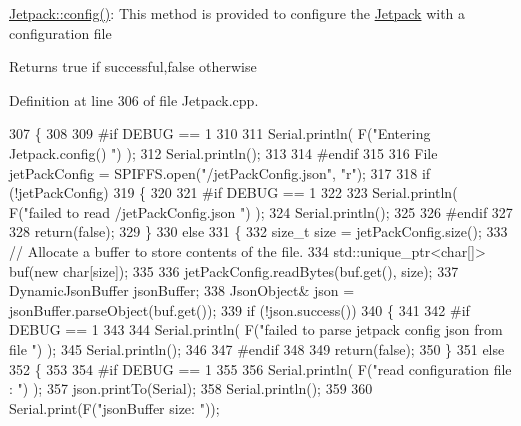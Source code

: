 \hyperlink{class_jetpack_ab065ee83e244265a2223a22f3ee4a719}{Jetpack\+::config()}\+: This method is provided to configure the \hyperlink{class_jetpack}{Jetpack} with a configuration file

\begin{DoxyReturn}{Returns}
true if successful,false otherwise 
\end{DoxyReturn}


Definition at line 306 of file Jetpack.\+cpp.


\begin{DoxyCode}
307 \{
308 
309 \textcolor{preprocessor}{#if DEBUG == 1 }
310 
311     Serial.println( F(\textcolor{stringliteral}{"Entering Jetpack.config() "}) );
312     Serial.println();
313 
314 \textcolor{preprocessor}{#endif}
315 
316     File jetPackConfig = SPIFFS.open(\textcolor{stringliteral}{"/jetPackConfig.json"}, \textcolor{stringliteral}{"r"});
317 
318     \textcolor{keywordflow}{if} (!jetPackConfig) 
319     \{
320 
321 \textcolor{preprocessor}{    #if DEBUG == 1 }
322 
323         Serial.println( F(\textcolor{stringliteral}{"failed to read /jetPackConfig.json "}) );
324         Serial.println();
325 
326 \textcolor{preprocessor}{    #endif}
327 
328         \textcolor{keywordflow}{return}(\textcolor{keyword}{false});
329     \}
330     \textcolor{keywordflow}{else}
331     \{
332         \textcolor{keywordtype}{size\_t} size = jetPackConfig.size();
333         \textcolor{comment}{// Allocate a buffer to store contents of the file.}
334         std::unique\_ptr<char[]> buf(\textcolor{keyword}{new} \textcolor{keywordtype}{char}[size]);
335 
336         jetPackConfig.readBytes(buf.get(), size);
337         DynamicJsonBuffer jsonBuffer;
338         JsonObject& json = jsonBuffer.parseObject(buf.get());
339         \textcolor{keywordflow}{if} (!json.success()) 
340         \{
341         
342 \textcolor{preprocessor}{        #if DEBUG == 1 }
343 
344             Serial.println( F(\textcolor{stringliteral}{"failed to parse jetpack config json from file "}) );
345             Serial.println();
346 
347 \textcolor{preprocessor}{        #endif}
348 
349             \textcolor{keywordflow}{return}(\textcolor{keyword}{false});
350         \} 
351         \textcolor{keywordflow}{else}
352         \{ 
353         
354 \textcolor{preprocessor}{        #if DEBUG == 1 }
355 
356             Serial.println( F(\textcolor{stringliteral}{"read configuration file : "}) );
357             json.printTo(Serial);
358             Serial.println();
359 
360             Serial.print(F(\textcolor{stringliteral}{"jsonBuffer size: "}));

\end{DoxyCode}
